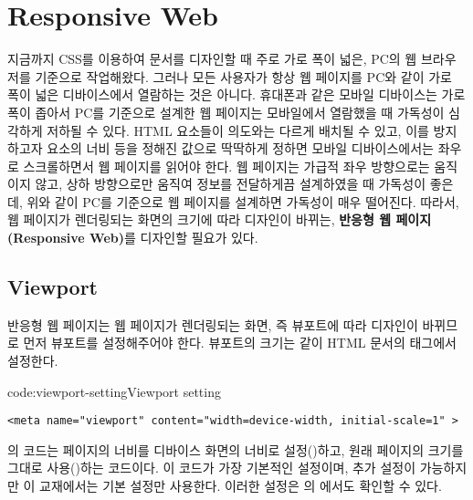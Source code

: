 \section{Responsive Web}\label{sect:responsive-web}

지금까지 CSS를 이용하여 문서를 디자인할 때 주로 가로 폭이 넓은, PC의 웹 브라우저를 기준으로 작업해왔다. 그러나 모든 사용자가 항상 웹 페이지를 PC와 같이 가로 폭이 넓은 디바이스에서 열람하는 것은 아니다. 휴대폰과 같은 모바일 디바이스는 가로 폭이 좁아서 PC를 기준으로 설계한 웹 페이지는 모바일에서 열람했을 때 가독성이 심각하게 저하될 수 있다. HTML 요소들이 의도와는 다르게 배치될 수 있고, 이를 방지하고자 요소의 너비 등을 정해진 값으로 딱딱하게 정하면 모바일 디바이스에서는 좌우로 스크롤하면서 웹 페이지를 읽어야 한다. 웹 페이지는 가급적 좌우 방향으로는 움직이지 않고, 상하 방향으로만 움직여 정보를 전달하게끔 설계하였을 때 가독성이 좋은데, 위와 같이 PC를 기준으로 웹 페이지를 설계하면 가독성이 매우 떨어진다. 따라서, 웹 페이지가 렌더링되는 화면의 크기에 따라 디자인이 바뀌는, \textbf{반응형 웹 페이지(Responsive Web)}를 디자인할 필요가 있다.


\subsection*{Viewport}
반응형 웹 페이지는 웹 페이지가 렌더링되는 화면, 즉 뷰포트에 따라 디자인이 바뀌므로 먼저 뷰포트를 설정해주어야 한다. 뷰포트의 크기는 \과 같이 HTML 문서의  태그에서 설정한다.

\begin{code}{code:viewport-setting}{Viewport setting}
\begin{verbatim}
<meta name="viewport" content="width=device-width, initial-scale=1" >
\end{verbatim}
\end{code}

의 코드는 페이지의 너비를 디바이스 화면의 너비로 설정()하고, 원래 페이지의 크기를 그대로 사용()하는 코드이다. 이 코드가 가장 기본적인 설정이며, 추가 설정이 가능하지만 이 교재에서는 기본 설정만 사용한다. 이러한 설정은 의 에서도 확인할 수 있다.


